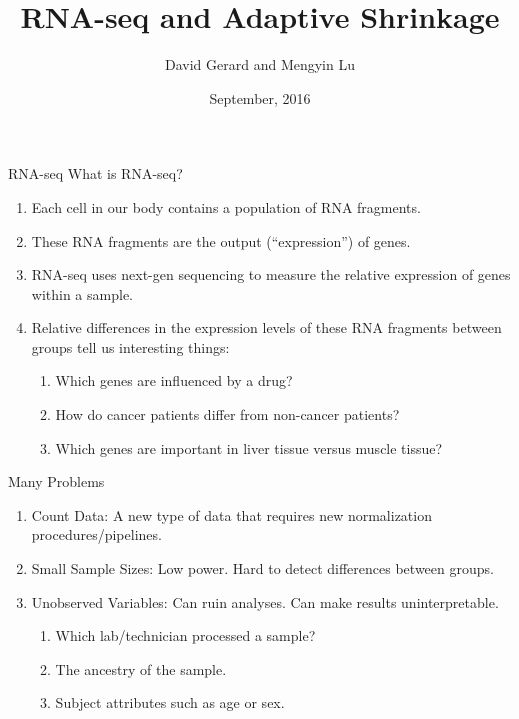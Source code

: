 \documentclass[evncountsect]{beamer}
\title{RNA-seq and Adaptive Shrinkage}
\author{David Gerard and Mengyin Lu}
\institute[UChicago]{
  Department of Human Genetics\\
  University of Chicago\\
  Boss: Matthew Stephens
}
\date[September 2016]{September, 2016}
\begin{document}
\begin{frame}
  \titlepage
\end{frame}

\begin{frame}{RNA-seq}
  What is RNA-seq?
  \begin{enumerate}
  \item Each cell in our body contains a population of RNA fragments. \medskip
  \item These RNA fragments are the output (``expression'') of genes.\medskip
  \item RNA-seq uses next-gen sequencing to measure the relative
    expression of genes within a sample.\medskip
  \item Relative differences in the expression levels of these RNA
    fragments between groups tell us interesting things:
    \begin{enumerate}
    \item Which genes are influenced by a drug?\smallskip
    \item How do cancer patients differ from non-cancer patients?\smallskip
    \item Which genes are important in liver tissue versus muscle tissue?
    \end{enumerate}
  \end{enumerate}

\end{frame}


\begin{frame}{Many Problems}
  \begin{enumerate}
  \item Count Data: A new type of data that requires new normalization
    procedures/pipelines.\medskip
  \item Small Sample Sizes: Low power. Hard to detect differences between groups.\medskip
  \item Unobserved Variables: Can ruin analyses. Can make results uninterpretable.
    \begin{enumerate}
    \item Which lab/technician processed a sample?\smallskip
    \item The ancestry of the sample.\smallskip
    \item Subject attributes such as age or sex.
    \end{enumerate}
  \end{enumerate}
\end{frame}
\end{document}
